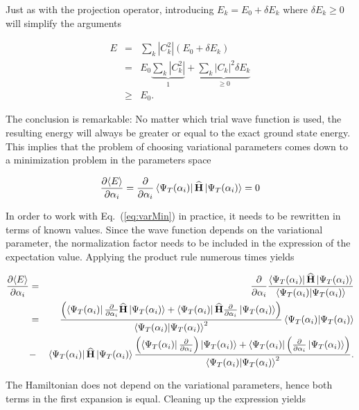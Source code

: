 Just as with the projection operator, introducing $E_k = E_0 + \delta E_k$ where $\delta E_k \ge 0$ will simplify the arguments

\begin{eqnarray*}
 E   &=& \sum_k |C_k^2| (E_0 + \delta E_k) \\
     &=& E_0 \underbrace{\sum_k |C_k^2|}_{1} + \underbrace{\sum_k |C_k|^2\delta E_k}_{\ge 0} \\
     &\ge& E_0.
\end{eqnarray*}

The conclusion is remarkable: No matter which trial wave function is used, the resulting energy will always be greater or equal to the exact ground state energy. This implies that the problem of choosing variational parameters comes down to a minimization problem in the parameters space

\begin{equation}
\label{eq:varMin}
\frac{\partial \langle E\rangle}{\partial \alpha_i} = \frac{\partial}{\partial \alpha_i}\left< \Psi_T(\alpha_i) \right|{\bf\widehat{H}}\left| \Psi_T(\alpha_i) \right> = 0
\end{equation}

In order to work with Eq.~(\ref{eq:varMin}) in practice, it needs to be rewritten in terms of known values. Since the wave function depends on the variational parameter, the normalization factor needs to be included in the expression of the expectation value. Applying the product rule numerous times yields

\newcommand{\Norm}{\braket{\Psi_T(\alpha_i)}{\Psi_T(\alpha_i)}}

\begin{eqnarray*}
 \frac{\partial \langle E\rangle}{\partial \alpha_i}  &=& \frac{\partial}{\partial \alpha_i} \frac{\bra{\Psi_T(\alpha_i)}\OP{H}\ket{\Psi_T(\alpha_i)}}{\Norm} \\
 &=& \frac{\left(\bra{\Psi_T(\alpha_i)}\frac{\partial}{\partial \alpha_i}\OP{H}\ket{\Psi_T(\alpha_i)} + \bra{\Psi_T(\alpha_i)}\OP{H}\frac{\partial}{\partial \alpha_i}\ket{\Psi_T(\alpha_i)}\right)}{\Norm^2}\Norm \\
 &-& \bra{\Psi_T(\alpha_i)}\OP{H}\ket{\Psi_T(\alpha_i)}\frac{\left(\bra{\Psi_T(\alpha_i)}\frac{\partial}{\partial \alpha_i}\right)\ket{\Psi_T(\alpha_i)} + \bra{\Psi_T(\alpha_i)}\left(\frac{\partial}{\partial \alpha_i}\ket{\Psi_T(\alpha_i)}\right)}{\Norm^2}.\\
\end{eqnarray*}

The Hamiltonian does not depend on the variational parameters, hence both terms in the first expansion is equal. Cleaning up the expression yields

